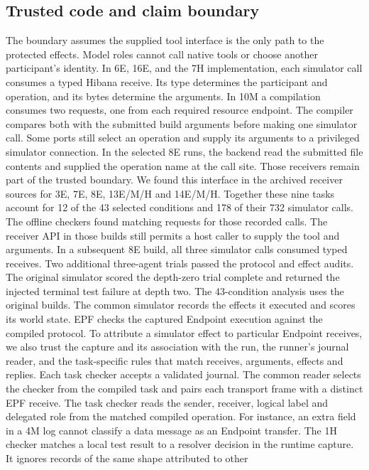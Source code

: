 \documentclass[10pt]{article}
\begin{document}
\subsection{Trusted code and claim boundary}
The boundary assumes the supplied tool interface is the only path to the
protected effects. Model roles cannot call native tools or choose another
participant's identity. In 6E, 16E, and the 7H implementation, each simulator
call consumes a typed Hibana receive. Its type determines the participant and
operation, and its bytes determine the arguments. In 10M a compilation consumes
two requests, one from each required resource endpoint. The compiler compares
both with the submitted build arguments before making one simulator call.
Some ports still select an operation and supply its arguments to a privileged
simulator connection. In the selected 8E runs, the backend read the submitted
file contents and supplied the operation name at the call site. Those receivers
remain part of the trusted boundary. We found this interface in the archived
receiver sources for 3E, 7E, 8E, 13E/M/H and 14E/M/H. Together these nine
tasks account for 12 of the 43 selected conditions and 178 of their 732
simulator calls. The offline checkers found matching requests for those
recorded calls. The receiver API in those builds still permits a host caller
to supply the tool and arguments.
In a subsequent 8E build, all three simulator calls consumed typed receives.
Two additional three-agent trials passed the protocol and effect audits.
The original simulator scored the depth-zero trial complete and returned the
injected terminal test failure at depth two. The 43-condition analysis uses the
original builds.
The common simulator records the effects it executed and scores its world state.
EPF checks the captured Endpoint execution against the compiled protocol.
To attribute a simulator effect to particular Endpoint receives, we also trust
the capture and its association with the run, the runner's journal reader, and
the task-specific rules that match receives, arguments, effects and replies.
Each task checker accepts a validated journal. The common reader selects the
checker from the compiled task and pairs each transport frame with a distinct
EPF receive. The task checker reads the sender, receiver, logical label and
delegated role from the matched compiled operation. For instance, an extra
field in a 4M log cannot classify a data message as an Endpoint transfer.
The 1H checker matches a local test result to a resolver decision in the
runtime capture. It ignores records of the same shape attributed to other
\end{document}
